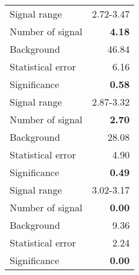  {\large{
 \begin{tabular}{||l r||}
 \hline
 \hline
Signal range &      2.72-3.47 \\
Number of signal &  \textbf{   4.18} \\
Background &          46.84 \\
Statistical error &    6.16 \\
Significance &      \textbf{   0.58} \\
 \hline
Signal range &      2.87-3.32 \\
Number of signal &  \textbf{   2.70} \\
Background &          28.08 \\
Statistical error &    4.90 \\
Significance &      \textbf{   0.49} \\
 \hline
Signal range &      3.02-3.17 \\
Number of signal &  \textbf{   0.00} \\
Background &           9.36 \\
Statistical error &    2.24 \\
Significance &      \textbf{   0.00} \\
 \hline
 \hline
 \end{tabular}
 }}
 \endinput
